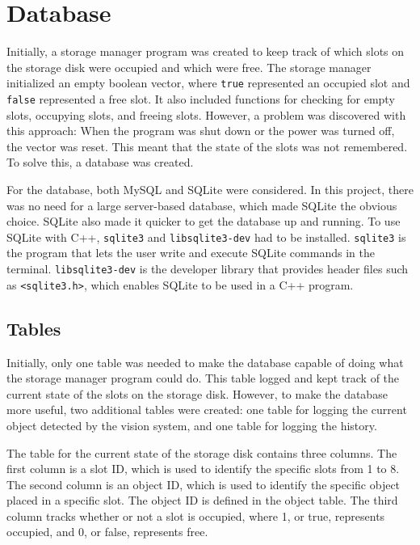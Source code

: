 \section{Database}
Initially, a storage manager program was created to keep track of which slots on the storage disk were occupied and which were free. The storage manager initialized an empty boolean vector, where \texttt{true} represented an occupied slot and \texttt{false} represented a free slot. It also included functions for checking for empty slots, occupying slots, and freeing slots. However, a problem was discovered with this approach: When the program was shut down or the power was turned off, the vector was reset. This meant that the state of the slots was not remembered. To solve this, a database was created. 

For the database, both MySQL and SQLite were considered. In this project, there was no need for a large server-based database, which made SQLite the obvious choice. SQLite also made it quicker to get the database up and running. %
To use SQLite with C++, \texttt{sqlite3} and \texttt{libsqlite3-dev} had to be installed. \texttt{sqlite3} is the program that lets the user write and execute SQLite commands in the terminal. \texttt{libsqlite3-dev} is the developer library that provides header files such as \texttt{<sqlite3.h>}, which enables SQLite to be used in a C++ program.

\subsection{Tables}
Initially, only one table was needed to make the database capable of doing what the storage manager program could do. This table logged and kept track of the current state of the slots on the storage disk. However, to make the database more useful, two additional tables were created: one table for logging the current object detected by the vision system, and one table for logging the history.

The table for the current state of the storage disk contains three columns. The first column is a slot ID, which is used to identify the specific slots from 1 to 8. The second column is an object ID, which is used to identify the specific object placed in a specific slot. The object ID is defined in the object table. The third column tracks whether or not a slot is occupied, where 1, or true, represents occupied, and 0, or false, represents free.

